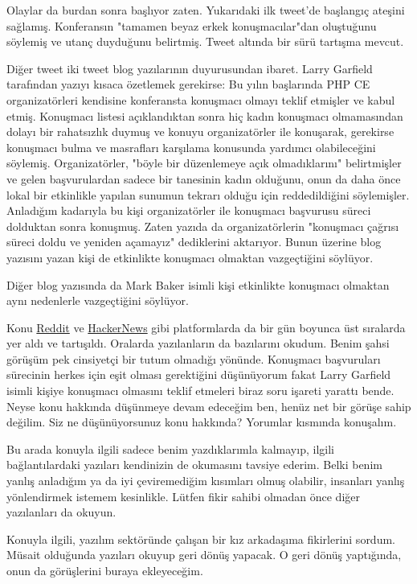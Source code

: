\documentclass[11pt]{article}
\begin{document}
Olaylar da burdan sonra başlıyor zaten. Yukarıdaki ilk tweet'de başlangıç
ateşini sağlamış. Konferansın "tamamen beyaz erkek konuşmacılar"dan oluştuğunu
söylemiş ve utanç duyduğunu belirtmiş. Tweet altında bir sürü tartışma mevcut.

Diğer tweet iki tweet blog yazılarının duyurusundan ibaret. Larry Garfield
tarafından yazıyı kısaca özetlemek gerekirse: Bu yılın başlarında PHP CE
organizatörleri kendisine konferansta konuşmacı olmayı teklif etmişler ve kabul
etmiş. Konuşmacı listesi açıklandıktan sonra hiç kadın konuşmacı olmamasından
dolayı bir rahatsızlık duymuş ve konuyu organizatörler ile konuşarak, gerekirse
konuşmacı bulma ve masrafları karşılama konusunda yardımcı olabileceğini
söylemiş. Organizatörler, "böyle bir düzenlemeye açık olmadıklarını"
belirtmişler ve gelen başvurulardan sadece bir tanesinin kadın olduğunu, onun
da daha önce lokal bir etkinlikle yapılan sunumun tekrarı olduğu için
reddedildiğini söylemişler. Anladığım kadarıyla bu kişi organizatörler ile
konuşmacı başvurusu süreci dolduktan sonra konuşmuş. Zaten yazıda da
organizatörlerin "konuşmacı çağrısı süreci doldu ve yeniden açamayız"
dediklerini aktarıyor. Bunun üzerine blog yazısını yazan kişi de etkinlikte
konuşmacı olmaktan vazgeçtiğini söylüyor.

Diğer blog yazısında da Mark Baker isimli kişi etkinlikte konuşmacı olmaktan
aynı nedenlerle vazgeçtiğini söylüyor.

Konu \href{https://www.reddit.com/r/programming/comments/cvtx3w/php\_central\_europe\_conference\_cancelled\_because/}{Reddit} ve \href{https://news.ycombinator.com/item?id=20795709}{HackerNews} gibi platformlarda da bir gün boyunca üst sıralarda
yer aldı ve tartışıldı. Oralarda yazılanların da bazılarını okudum. Benim şahsi
görüşüm pek cinsiyetçi bir tutum olmadığı yönünde. Konuşmacı başvuruları
sürecinin herkes için eşit olması gerektiğini düşünüyorum fakat Larry Garfield
isimli kişiye konuşmacı olmasını teklif etmeleri biraz soru işareti yarattı
bende. Neyse konu hakkında düşünmeye devam edeceğim ben, henüz net bir görüşe
sahip değilim. Siz ne düşünüyorsunuz konu hakkında? Yorumlar kısmında
konuşalım.

Bu arada konuyla ilgili sadece benim yazdıklarımla kalmayıp, ilgili
bağlantılardaki yazıları kendinizin de okumasını tavsiye ederim. Belki benim
yanlış anladığım ya da iyi çeviremediğim kısımları olmuş olabilir, insanları
yanlış yönlendirmek istemem kesinlikle. Lütfen fikir sahibi olmadan önce diğer
yazılanları da okuyun.

Konuyla ilgili, yazılım sektöründe çalışan bir kız arkadaşıma fikirlerini
sordum. Müsait olduğunda yazıları okuyup geri dönüş yapacak. O geri dönüş
yaptığında, onun da görüşlerini buraya ekleyeceğim.
\end{document}
